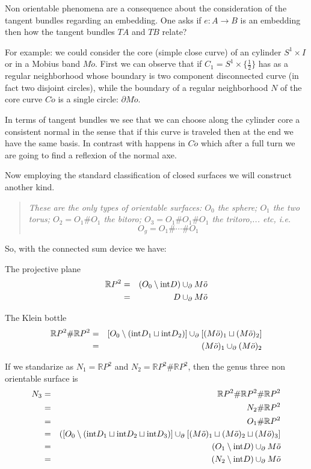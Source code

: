 \documentclass[12pt]{article}
\begin{document}
Non orientable phenomena are a consequence about the consideration of the tangent bundles regarding an embedding. One asks if $e:A\to B$ is an embedding then how the tangent bundles $TA$ and $TB$ relate?
 


For example: we could consider the core (simple close curve) of an cylinder $S^1\times I$ or in a Mobius band 
$M\ddot{o}$. First we can observe that if $C_1=S^1\times\{ \frac{1}{2}\}$  has as a regular neighborhood whose boundary is two component disconnected curve (in fact two disjoint circles), while the boundary of a regular neighborhood $N$ of the core curve $C\ddot{o}$ is a single circle: $\partial M\ddot{o}$.

In terms of tangent bundles we see that we can choose along the cylinder core a consistent normal in the sense that if this curve is traveled then at the end we have the same basis. In contrast with happens in $C\ddot{o}$ which after a full turn we are going to find a reflexion of the normal axe.   

Now employing the standard classification of closed surfaces we will construct another kind.

\begin{quote}
{\it These are the only types of orientable surfaces: $O_0$ the sphere; $O_1$ the two torus; $O_2=O_1\# O_1$ the bitoro; $O_3=O_1\# O_1\# O_1$ the tritoro,... etc,
i.e.
$$O_g=O_1\# \cdots\# O_1$$}
\end{quote}   

So, with the connected sum device we have:
\bigskip


The projective plane
\begin{eqnarray*}
{\mathbb{R}}P^2&=&(O_0\setminus{\rm{int}}D)\cup_{\partial}M\ddot{o}\\
&=&D\cup_{\partial}M\ddot{o}
\end{eqnarray*}

\bigskip

The Klein bottle
\begin{eqnarray*}
{\mathbb{R}}P^2\#{\mathbb{R}}P^2
&=&[O_0\setminus( {\rm{int}}D_1\sqcup {\rm{int}}D_2)]\cup_{\partial}
[(M\ddot{o})_1\sqcup (M\ddot{o})_2]\\
&=&(M\ddot{o})_1\cup_{\partial}(M\ddot{o})_2
\end{eqnarray*}

\bigskip

If we standarize as $N_1={\mathbb{R}}P^2$ and $N_2={\mathbb{R}}P^2\#{\mathbb{R}}P^2$, then the genus three non orientable surface is
\begin{eqnarray*}
N_3&=&{\mathbb{R}}P^2\#{\mathbb{R}}P^2\#{\mathbb{R}}P^2\\
&=&N_2\#{\mathbb{R}}P^2\\
&=&O_1\#{\mathbb{R}}P^2\\
&=&(
[O_0\setminus({\rm{int}}D_1\sqcup {\rm{int}}D_2\sqcup {\rm{int}}D_3)]\cup_{\partial}
[(M\ddot{o})_1\sqcup (M\ddot{o})_2\sqcup (M\ddot{o})_3]\\
&=&(O_1\setminus{\rm{int}}D)\cup_{\partial}M\ddot{o}\\
&=&(N_2\setminus{\rm{int}}D)\cup_{\partial}M\ddot{o}
\end{eqnarray*}
\end{document}
